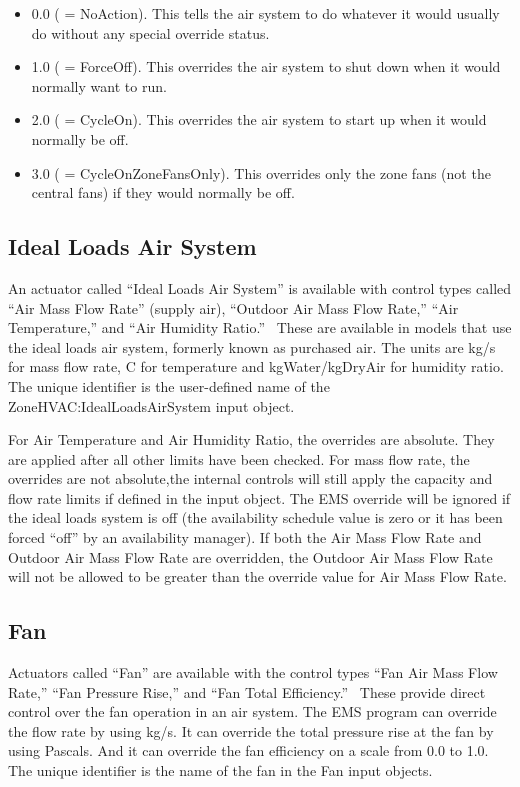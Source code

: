 \begin{itemize}
\item
  0.0 ( = NoAction). This tells the air system to do whatever it would usually do without any special override status.
\item
  1.0 ( = ForceOff). This overrides the air system to shut down when it would normally want to run.
\item
  2.0 ( = CycleOn). This overrides the air system to start up when it would normally be off.
\item
  3.0 ( = CycleOnZoneFansOnly). This overrides only the zone fans (not the central fans) if they would normally be off.
\end{itemize}

\subsection{Ideal Loads Air System}\label{ideal-loads-air-system}

An actuator called ``Ideal Loads Air System'' is available with control types called ``Air Mass Flow Rate'' (supply air), ``Outdoor Air Mass Flow Rate,'' ``Air Temperature,'' and ``Air Humidity Ratio.'' ~These are available in models that use the ideal loads air system, formerly known as purchased air. The units are kg/s for mass flow rate, C for temperature and kgWater/kgDryAir for humidity ratio. The unique identifier is the user-defined name of the ZoneHVAC:IdealLoadsAirSystem input object.

For Air Temperature and Air Humidity Ratio, the overrides are absolute. They are applied after all other limits have been checked. For mass flow rate, the overrides are not absolute,the internal controls will still apply the capacity and flow rate limits if defined in the input object. The EMS override will be ignored if the ideal loads system is off (the availability schedule value is zero or it has  been forced ``off'' by an availability manager). If both the Air Mass Flow Rate and Outdoor Air Mass Flow Rate are overridden, the Outdoor Air Mass Flow Rate will not be allowed to be greater than the override value for Air Mass Flow Rate.

\subsection{Fan}\label{fan}

Actuators called ``Fan'' are available with the control types ``Fan Air Mass Flow Rate,'' ``Fan Pressure Rise,'' and ``Fan Total Efficiency.''~ These provide direct control over the fan operation in an air system. The EMS program can override the flow rate by using kg/s. It can override the total pressure rise at the fan by using Pascals. And it can override the fan efficiency on a scale from 0.0 to 1.0. The unique identifier is the name of the fan in the Fan input objects.

